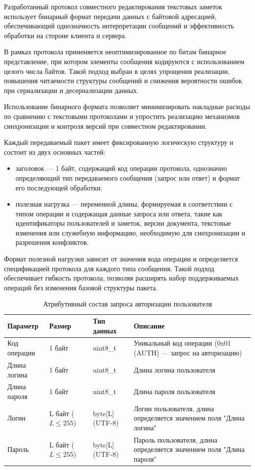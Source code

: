 Разработанный протокол совместного редактирования текстовых заметок использует бинарный формат передачи данных с байтовой адресацией, обеспечивающий однозначность интерпретации сообщений и эффективность обработки на стороне клиента и сервера.

В рамках протокола применяется неоптимизированное по битам бинарное представление, при котором элементы сообщения кодируются с использованием целого числа байтов. Такой подход выбран в целях упрощения реализации, повышения читаемости структуры сообщений и снижения вероятности ошибок при сериализации и десериализации данных.

Использование бинарного формата позволяет минимизировать накладные расходы по сравнению с текстовыми протоколами и упростить реализацию механизмов синхронизации и контроля версий при совместном редактировании.

Каждый передаваемый пакет имеет фиксированную логическую структуру и состоит из двух основных частей:

\begin{itemize}
    \item заголовок — 1 байт, содержащий код операции протокола, однозначно определяющий тип передаваемого сообщения (запрос или ответ) и формат его последующей обработки;
    \item полезная нагрузка — переменной длины, формируемая в соответствии с типом операции и содержащая данные запроса или ответа, такие как идентификаторы пользователей и заметок, версии документа, текстовые изменения или служебную информацию, необходимую для синхронизации и разрешения конфликтов.
\end{itemize}

Формат полезной нагрузки зависит от значения кода операции и определяется спецификацией протокола для каждого типа сообщения. Такой подход обеспечивает гибкость протокола, позволяя расширять набор поддерживаемых операций без изменения базовой структуры пакета.

\begin{table}[H]
    \centering
    \caption{Атрибутивный состав запроса авторизации пользователя}
    \begin{tabular}{|p{4cm}|p{2cm}|p{3cm}|p{6cm}|}
    \hline
    \textbf{Параметр} & \textbf{Размер} & \textbf{Тип данных} & \textbf{Описание} \\ \hline
    Код операции & 1 байт & uint8\_t & Уникальный код операции (0x01 (AUTH) — запрос на авторизацию) \\ \hline
    Длина логина & 1 байт & uint8\_t & Длина логина пользователя \\ \hline
    Длина пароля & 1 байт & uint8\_t & Длина пароля пользователя \\ \hline
    Логин & L байт (\(L \le 255\)) & byte[L] (UTF-8) & Логин пользователя, длина определяется значением поля "Длина логина" \\ \hline
    Пароль & L байт (\(L \le 255\)) & byte[L] (UTF-8) & Пароль пользователя, длина определяется значением поля "Длина пароля" \\ \hline
    \end{tabular}
    \label{tab:auth_request}
\end{table}

